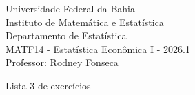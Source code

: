 \documentclass{article}
\date{--/--/----} %
\begin{document}
\begin{flushleft}
	Universidade Federal da Bahia\\
	Instituto de Matemática e Estatística\\
	Departamento de Estatística\\
	MATF14 - Estatística Econômica I - 2026.1\\
	Professor: Rodney Fonseca \\
\end{flushleft}

\begin{center}
	\begin{Large}
		Lista 3 de exercícios \\
	\end{Large}	
\end{center}





\vspace{2em}
\end{document}
